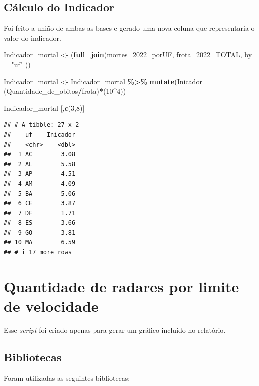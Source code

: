 \documentclass[
]{book}
\newenvironment{Shaded}{\begin{snugshade}}{\end{snugshade}}
\newcommand{\AttributeTok}[1]{\textcolor[rgb]{0.13,0.29,0.53}{#1}}
\newcommand{\DecValTok}[1]{\textcolor[rgb]{0.00,0.00,0.81}{#1}}
\newcommand{\FunctionTok}[1]{\textcolor[rgb]{0.13,0.29,0.53}{\textbf{#1}}}
\newcommand{\NormalTok}[1]{#1}
\newcommand{\OtherTok}[1]{\textcolor[rgb]{0.56,0.35,0.01}{#1}}
\newcommand{\SpecialCharTok}[1]{\textcolor[rgb]{0.81,0.36,0.00}{\textbf{#1}}}
\newcommand{\StringTok}[1]{\textcolor[rgb]{0.31,0.60,0.02}{#1}}
\begin{document}
\section{Cálculo do Indicador}\label{cuxe1lculo-do-indicador-1}

Foi feito a união de ambas as bases e gerado uma nova coluna que representaria o valor do indicador.

\begin{Shaded}
\begin{Highlighting}[]
\NormalTok{Indicador\_mortal }\OtherTok{\textless{}{-}}\NormalTok{ (}\FunctionTok{full\_join}\NormalTok{(mortes\_2022\_porUF, frota\_2022\_TOTAL, }\AttributeTok{by =} \StringTok{"uf"}\NormalTok{ ))}

\NormalTok{Indicador\_mortal }\OtherTok{\textless{}{-}}\NormalTok{ Indicador\_mortal }\SpecialCharTok{\%\textgreater{}\%} 
  \FunctionTok{mutate}\NormalTok{(}\AttributeTok{Inicador =}\NormalTok{ (Quantidade\_de\_obitos}\SpecialCharTok{/}\NormalTok{frota)}\SpecialCharTok{*}\NormalTok{(}\DecValTok{10}\SpecialCharTok{\^{}}\DecValTok{4}\NormalTok{))}

\NormalTok{Indicador\_mortal [,}\FunctionTok{c}\NormalTok{(}\DecValTok{3}\NormalTok{,}\DecValTok{8}\NormalTok{)]}
\end{Highlighting}
\end{Shaded}

\begin{verbatim}
## # A tibble: 27 x 2
##    uf    Inicador
##    <chr>    <dbl>
##  1 AC        3.08
##  2 AL        5.58
##  3 AP        4.51
##  4 AM        4.09
##  5 BA        5.06
##  6 CE        3.87
##  7 DF        1.71
##  8 ES        3.66
##  9 GO        3.81
## 10 MA        6.59
## # i 17 more rows
\end{verbatim}

\chapter{Quantidade de radares por limite de velocidade}\label{quantidade-de-radares-por-limite-de-velocidade}

Esse \emph{script} foi criado apenas para gerar um gráfico incluído no relatório.

\section{Bibliotecas}\label{bibliotecas-3}

Foram utilizadas as seguintes bibliotecas:
\end{document}
